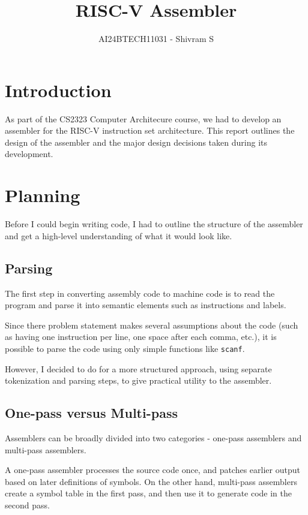 \documentclass{article}
\title{RISC-V Assembler}
\author{AI24BTECH11031 - Shivram S}
\begin{document}
\maketitle
\tableofcontents
\pagebreak

\section{Introduction}

As part of the CS2323 Computer Architecure course, we had to develop an assembler
for the RISC-V instruction set architecture. This report outlines the design of the 
assembler and the major design decisions taken during its development.

\section{Planning}

Before I could begin writing code, I had to outline the structure of the assembler
and get a high-level understanding of what it would look like.

\subsection{Parsing}

The first step in converting assembly code to machine code is to read the program
and parse it into semantic elements such as instructions and labels.

Since there problem statement makes several assumptions about the code (such
as having one instruction per line, one space after each comma, etc.), it is possible
to parse the code using only simple functions like \texttt{scanf}.

However, I decided to do for a more structured approach, using separate tokenization
and parsing steps, to give practical utility to the assembler.

\subsection{One-pass versus Multi-pass}

Assemblers can be broadly divided into two categories - one-pass assemblers and
multi-pass assemblers.

A one-pass assembler processes the source code once, and patches earlier output
based on later definitions of symbols. On the other hand, multi-pass assemblers
create a symbol table in the first pass, and then use it to generate code in the 
second pass.
\end{document}
